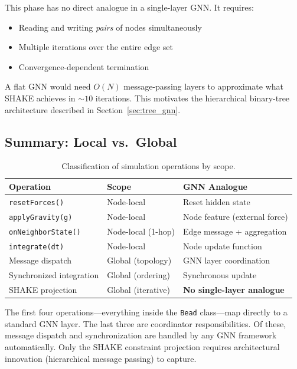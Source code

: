 \documentclass[11pt,a4paper]{article}
\begin{document}
This phase has no direct analogue in a single-layer GNN. It requires:
\begin{itemize}
    \item Reading and writing \emph{pairs} of nodes simultaneously
    \item Multiple iterations over the entire edge set
    \item Convergence-dependent termination
\end{itemize}

A flat GNN would need $O(N)$ message-passing layers to approximate what SHAKE
achieves in ${\sim}10$ iterations. This motivates the hierarchical
binary-tree architecture described in Section~\ref{sec:tree_gnn}.

\subsection{Summary: Local vs.\ Global}

\begin{table}[H]
\centering
\begin{tabular}{lll}
\toprule
Operation & Scope & GNN Analogue \\
\midrule
\texttt{resetForces()} & Node-local & Reset hidden state \\
\texttt{applyGravity(g)} & Node-local & Node feature (external force) \\
\texttt{onNeighborState()} & Node-local (1-hop) & Edge message + aggregation \\
\texttt{integrate(dt)} & Node-local & Node update function \\
\midrule
Message dispatch & Global (topology) & GNN layer coordination \\
Synchronized integration & Global (ordering) & Synchronous update \\
SHAKE projection & Global (iterative) & \textbf{No single-layer analogue} \\
\bottomrule
\end{tabular}
\caption{Classification of simulation operations by scope.}
\label{tab:local_global}
\end{table}

The first four operations---everything inside the \texttt{Bead} class---map
directly to a standard GNN layer. The last three are coordinator
responsibilities. Of these, message dispatch and synchronization are handled
by any GNN framework automatically. Only the SHAKE constraint projection
requires architectural innovation (hierarchical message passing) to capture.
\end{document}
